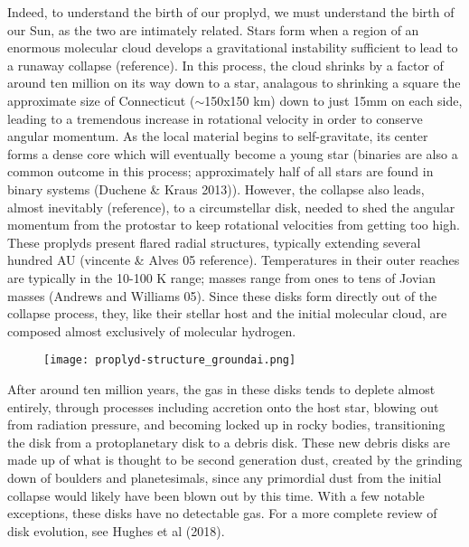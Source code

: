 Indeed, to understand the birth of our proplyd, we must understand the birth of our Sun, as the two are intimately related. Stars form when a region of an enormous molecular cloud develops a gravitational instability sufficient to lead to a runaway collapse (reference). In this process, the cloud shrinks by a factor of around ten million on its way down to a star, analagous to shrinking a square the approximate size of Connecticut ($\sim$150x150 km) down to just 15mm on each side, leading to a tremendous increase in rotational velocity in order to conserve angular momentum. As the local material begins to self-gravitate, its center forms a dense core which will eventually become a young star (binaries are also a common outcome in this process; approximately half of all stars are found in binary systems (Duchene & Kraus 2013)). However, the collapse also leads, almost inevitably (reference), to a circumstellar disk, needed to shed the angular momentum from the protostar to keep rotational velocities from getting too high. These proplyds present flared radial structures, typically extending several hundred AU (vincente & Alves 05 reference). Temperatures in their outer reaches are typically in the 10-100 K range; masses range from ones to tens of Jovian masses (Andrews and Williams 05). Since these disks form directly out of the collapse process, they, like their stellar host and the initial molecular cloud, are composed almost exclusively of molecular hydrogen.

\begin{figure}[htp]
  \hspace*{\fill}%
  \texttt{[image: proplyd-structure\_groundai.png]}\hfill%
  \hspace*{\fill}%
  \label{fig:proplyd}
\end{figure}

After around ten million years, the gas in these disks tends to deplete almost entirely, through processes including accretion onto the host star, blowing out from radiation pressure, and becoming locked up in rocky bodies, transitioning the disk from a protoplanetary disk to a debris disk. These new debris disks are made up of what is thought to be second generation dust, created by the grinding down of boulders and planetesimals, since any primordial dust from the initial collapse would likely have been blown out by this time. With a few notable exceptions, these disks have no detectable gas. For a more complete review of disk evolution, see Hughes et al (2018).





